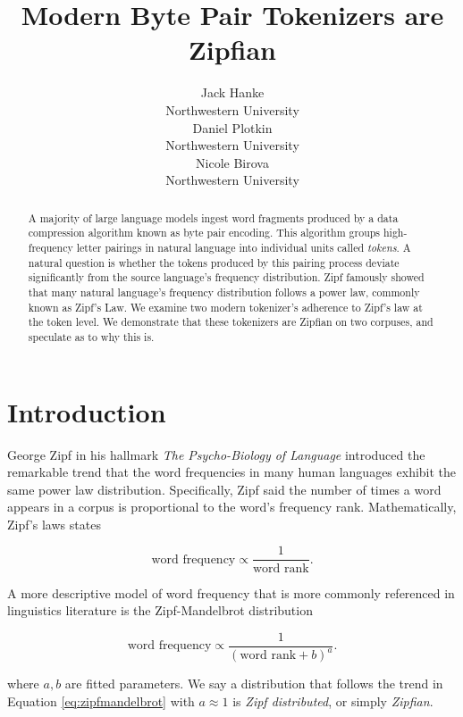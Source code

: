 \documentclass[11pt]{article}
\title{Modern Byte Pair Tokenizers are Zipfian}
\author{Jack Hanke \\
  Northwestern University \\
  \And
  Daniel Plotkin \\
  Northwestern University \\
  \And
  Nicole Birova \\
  Northwestern University}
\begin{document}
\maketitle
\begin{abstract}
A majority of large language models ingest word fragments produced by a data compression algorithm known as byte pair encoding. This algorithm groups high-frequency letter pairings in natural language into individual units called  \textit{tokens}. A natural question is whether the tokens produced by this pairing process deviate significantly from the source language's frequency distribution. Zipf famously showed that many natural language's frequency distribution follows a power law, commonly known as Zipf's Law. We examine two modern tokenizer's adherence to Zipf's law at the token level. We demonstrate that these tokenizers are Zipfian on two corpuses, and speculate as to why this is.
\end{abstract}

\section{Introduction}
\label{section:intro}

George Zipf in his hallmark \textit{The Psycho-Biology of Language} \cite{Zip35} introduced the remarkable trend that the word frequencies in many human languages exhibit the same power law distribution. Specifically, Zipf said the number of times a word appears in a corpus is proportional to the word's frequency rank. Mathematically, Zipf's laws states

\begin{equation}
    \mbox{word frequency} \propto \frac{1}{\mbox{word rank}}.
\end{equation}

A more descriptive model of word frequency that is more commonly referenced in linguistics literature is the Zipf-Mandelbrot distribution

\begin{equation}
    \mbox{word frequency} \propto \frac{1}{(\mbox{word rank} + b)^a}.
    \label{eq:zipfmandelbrot}
\end{equation}

where $a,b$ are fitted parameters. We say a distribution that follows the trend in Equation \ref{eq:zipfmandelbrot} with $a \approx 1$ is \textit{Zipf distributed}, or simply \textit{Zipfian}.
\end{document}
